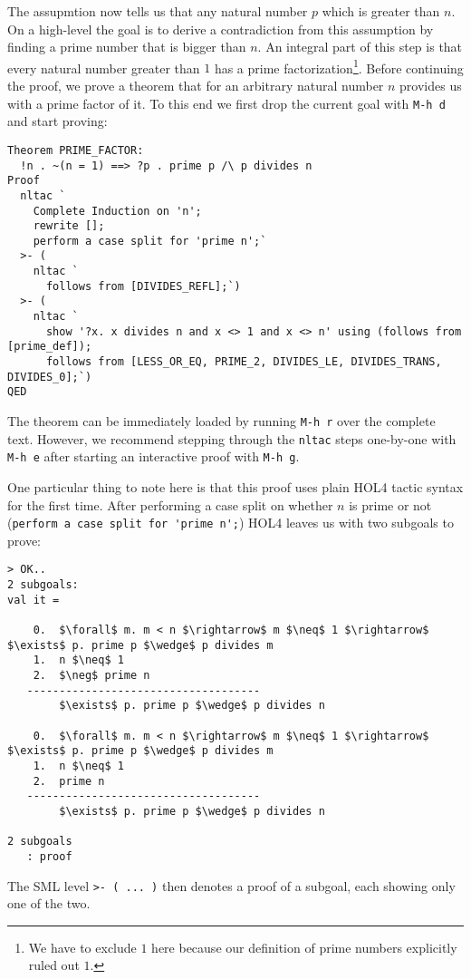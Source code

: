 \documentclass[10pt]{scrartcl}
\newcommand{\ekey}[1]{\texttt{#1}}
\begin{document}
The assupmtion now tells us that any natural number $p$ which is greater than
$n$.
On a high-level the goal is to derive a contradiction from this assumption by
finding a prime number that is bigger than $n$.
An integral part of this step is that every natural number greater than $1$ has
a prime factorization\footnote{We have to exclude $1$ here because our definition of prime numbers explicitly ruled out $1$.}.
Before continuing the proof, we prove a theorem that for an arbitrary natural
number $n$ provides us with a prime factor of it.
To this end we first drop the current goal with \ekey{M-h d} and start proving:
\begin{lstlisting}
Theorem PRIME_FACTOR:
  !n . ~(n = 1) ==> ?p . prime p /\ p divides n
Proof
  nltac `
    Complete Induction on 'n';
    rewrite [];
    perform a case split for 'prime n';`
  >- (
    nltac `
      follows from [DIVIDES_REFL];`)
  >- (
    nltac `
      show '?x. x divides n and x <> 1 and x <> n' using (follows from [prime_def]);
      follows from [LESS_OR_EQ, PRIME_2, DIVIDES_LE, DIVIDES_TRANS, DIVIDES_0];`)
QED
\end{lstlisting}

The theorem can be immediately loaded by running \ekey{M-h r} over the complete
text.
However, we recommend stepping through the \lstinline{nltac} steps one-by-one
with \ekey{M-h e} after starting an interactive proof with \ekey{M-h g}.

One particular thing to note here is that this proof uses plain HOL4 tactic
syntax for the first time.
After performing a case split on whether $n$ is prime or not
(\lstinline{perform a case split for 'prime n';}) HOL4 leaves us with two
subgoals to prove:

\begin{lstlisting}[frame=single]
> OK..
2 subgoals:
val it =

    0.  $\forall$ m. m < n $\rightarrow$ m $\neq$ 1 $\rightarrow$ $\exists$ p. prime p $\wedge$ p divides m
    1.  n $\neq$ 1
    2.  $\neg$ prime n
   ------------------------------------
        $\exists$ p. prime p $\wedge$ p divides n

    0.  $\forall$ m. m < n $\rightarrow$ m $\neq$ 1 $\rightarrow$ $\exists$ p. prime p $\wedge$ p divides m
    1.  n $\neq$ 1
    2.  prime n
   ------------------------------------
        $\exists$ p. prime p $\wedge$ p divides n

2 subgoals
   : proof
\end{lstlisting}

The SML level \lstinline{>- ( ... )} then denotes a proof of a subgoal, each
showing only one of the two.
\end{document}
